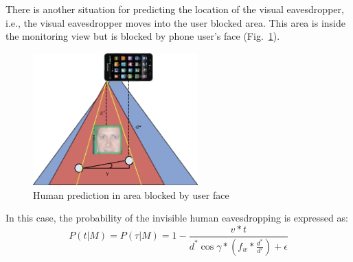 There is another situation for predicting the location of the visual eavesdropper, i.e., the visual eavesdropper  moves into the user blocked area. This area is inside the monitoring view but is blocked by phone user's face (Fig.~\ref{fig:invisible-blocked}).
\begin{figure}[H]
\centering
\includegraphics[width=2.5in]{areaMotionBlocked.eps}
\caption{ Human prediction in area blocked by user face}
\label{fig:invisible-blocked}
\end{figure}
In this case, the probability of the invisible human eavesdropping is expressed as:
\begin{equation}
P(t|M)=P(\tau|M)=1-\frac{v*t}{d^*\cos\gamma*(f_w*\frac{d^*}{d'})+\epsilon}
\label{eqn:prob}
\end{equation}



